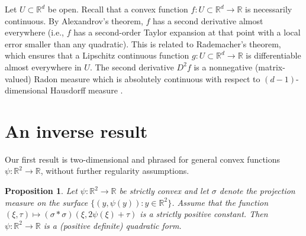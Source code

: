\documentclass[11pt]{amsart}
\def\R{\mathbb{R}}
\newtheorem{proposition}[theorem]{Proposition}
\begin{document}
Let $U\subset\R^d$ be open.
Recall that a convex function $f:U\subset\R^d\to\R$ is necessarily continuous.
By Alexandrov's theorem, $f$ has a second derivative almost everywhere (i.e., $f$ has a second-order Taylor expansion at that point with a local error smaller than any quadratic). This is related to Rademacher's theorem,  which ensures that a Lipschitz continuous function $g:U\subset\R^d\to\R$ is differentiable almost everywhere in $U$. The second derivative $D^2f$ is a nonnegative (matrix-valued) Radon measure which is absolutely continuous with respect to $(d-1)$-dimensional Hausdorff measure \cite{Dud77}.

\section{An inverse result}


Our first result is two-dimensional and  phrased for general convex functions $\psi:\R^2\to\R$, without further regularity assumptions.
\begin{proposition}
    Let $\psi:\R^2\to\R$ be strictly convex and let $\sigma$ denote the projection measure on the surface %
    $\{(y,\psi(y)):y\in\R^2\}$.
    Assume that the function $(\xi,\tau)\mapsto(\sigma\ast\sigma)(\xi,2\psi(\xi)+\tau)$ is a strictly positive constant. Then  $\psi:\R^2\to\R$ is a (positive definite) quadratic form.
\end{proposition}
    
\end{document}
